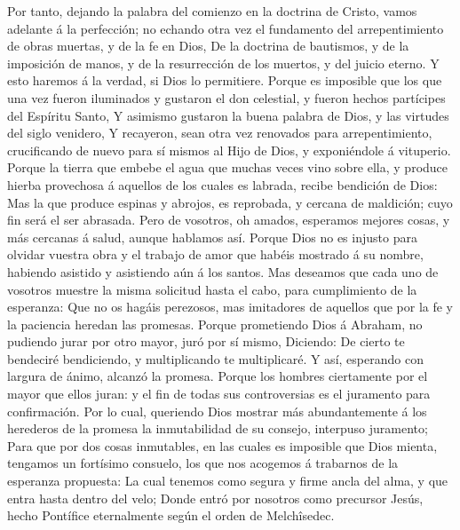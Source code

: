  Por tanto, dejando la palabra del comienzo en la doctrina
de Cristo, vamos adelante á la perfección; no echando otra vez el
fundamento del arrepentimiento de obras muertas, y de la fe en Dios,
 De la doctrina de bautismos, y de la imposición de manos,
y de la resurrección de los muertos, y del juicio eterno. 
Y esto haremos á la verdad, si Dios lo permitiere.  Porque
es imposible que los que una vez fueron iluminados y gustaron el don
celestial, y fueron hechos partícipes del Espíritu Santo, 
Y asimismo gustaron la buena palabra de Dios, y las virtudes del siglo
venidero,  Y recayeron, sean otra vez renovados para
arrepentimiento, crucificando de nuevo para sí mismos al Hijo de Dios, y
exponiéndole á vituperio.  Porque la tierra que embebe el
agua que muchas veces vino sobre ella, y produce hierba provechosa á
aquellos de los cuales es labrada, recibe bendición de Dios:
 Mas la que produce espinas y abrojos, es reprobada, y
cercana de maldición; cuyo fin será el ser abrasada.  Pero
de vosotros, oh amados, esperamos mejores cosas, y más cercanas á salud,
aunque hablamos así.  Porque Dios no es injusto para
olvidar vuestra obra y el trabajo de amor que habéis mostrado á su
nombre, habiendo asistido y asistiendo aún á los santos. 
Mas deseamos que cada uno de vosotros muestre la misma solicitud hasta
el cabo, para cumplimiento de la esperanza:  Que no os
hagáis perezosos, mas imitadores de aquellos que por la fe y la
paciencia heredan las promesas.  Porque prometiendo Dios
á Abraham, no pudiendo jurar por otro mayor, juró por sí mismo,
 Diciendo: De cierto te bendeciré bendiciendo, y
multiplicando te multiplicaré.  Y así, esperando con
largura de ánimo, alcanzó la promesa.  Porque los hombres
ciertamente por el mayor que ellos juran: y el fin de todas sus
controversias es el juramento para confirmación.  Por lo
cual, queriendo Dios mostrar más abundantemente á los herederos de la
promesa la inmutabilidad de su consejo, interpuso juramento;
 Para que por dos cosas inmutables, en las cuales es
imposible que Dios mienta, tengamos un fortísimo consuelo, los que nos
acogemos á trabarnos de la esperanza propuesta:  La cual
tenemos como segura y firme ancla del alma, y que entra hasta dentro del
velo;  Donde entró por nosotros como precursor Jesús,
hecho Pontífice eternalmente según el orden de Melchîsedec.

